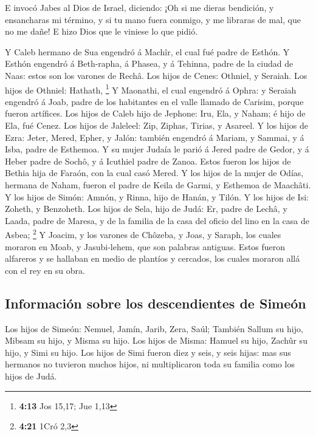  E invocó Jabes al Dios de Israel, diciendo: ¡Oh si me
dieras bendición, y ensancharas mi término, y si tu mano fuera conmigo,
y me libraras de mal, que no me dañe! E hizo Dios que le viniese lo que
pidió.

 Y Caleb hermano de Sua engendró á Machîr, el cual fué
padre de Esthón.  Y Esthón engendró á Beth-rapha, á
Phasea, y á Tehinna, padre de la ciudad de Naas: estos son los varones
de Rechâ.  Los hijos de Cenes: Othniel, y Seraiah. Los
hijos de Othniel: Hathath, \footnote{\textbf{4:13} Jos 15,17; Jue 1,13}
 Y Maonathi, el cual engendró á Ophra: y Seraiah engendró
á Joab, padre de los habitantes en el valle llamado de Carisim, porque
fueron artífices.  Los hijos de Caleb hijo de Jephone:
Iru, Ela, y Naham; é hijo de Ela, fué Cenez.  Los hijos
de Jaleleel: Zip, Ziphas, Tirias, y Asareel.  Y los hijos
de Ezra: Jeter, Mered, Epher, y Jalón: también engendró á Mariam, y
Sammai, y á Isba, padre de Esthemoa.  Y su mujer Judaía
le parió á Jered padre de Gedor, y á Heber padre de Sochô, y á Icuthiel
padre de Zanoa. Estos fueron los hijos de Bethia hija de Faraón, con la
cual casó Mered.  Y los hijos de la mujer de Odías,
hermana de Naham, fueron el padre de Keila de Garmi, y Esthemoa de
Maachâti.  Y los hijos de Simón: Amnón, y Rinna, hijo de
Hanán, y Tilón. Y los hijos de Isi: Zoheth, y Benzoheth. 
Los hijos de Sela, hijo de Judá: Er, padre de Lechâ, y Laada, padre de
Maresa, y de la familia de la casa del oficio del lino en la casa de
Asbea; \footnote{\textbf{4:21} 1Cró 2,3}  Y Joacim, y los
varones de Chôzeba, y Joas, y Saraph, los cuales moraron en Moab, y
Jasubi-lehem, que son palabras antiguas.  Estos fueron
alfareros y se hallaban en medio de plantíos y cercados, los cuales
moraron allá con el rey en su obra.

\hypertarget{informaciuxf3n-sobre-los-descendientes-de-simeuxf3n}{%
\subsection{Información sobre los descendientes de
Simeón}\label{informaciuxf3n-sobre-los-descendientes-de-simeuxf3n}}

 Los hijos de Simeón: Nemuel, Jamín, Jarib, Zera, Saúl;
 También Sallum su hijo, Mibsam su hijo, y Misma su hijo.
 Los hijos de Misma: Hamuel su hijo, Zachûr su hijo, y
Simi su hijo.  Los hijos de Simi fueron diez y seis, y
seis hijas: mas sus hermanos no tuvieron muchos hijos, ni multiplicaron
toda su familia como los hijos de Judá.

